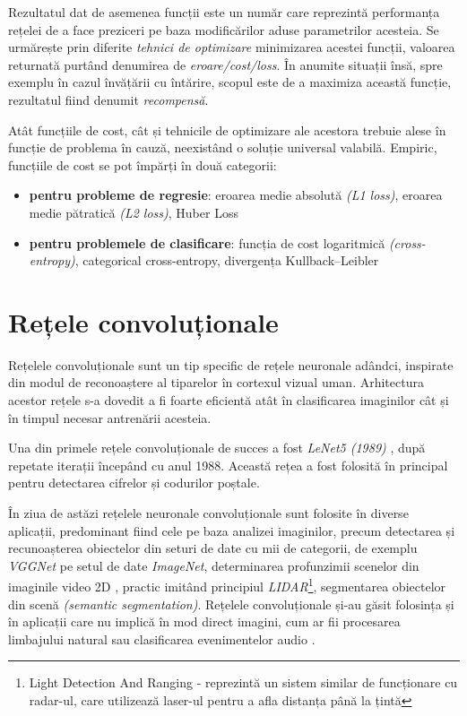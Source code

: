 Rezultatul dat de asemenea funcții este un număr care reprezintă performanța rețelei de a face preziceri pe baza modificărilor aduse parametrilor acesteia. Se urmărește prin diferite \textit{tehnici de optimizare} minimizarea acestei funcții, valoarea returnată purtând denumirea de \textit{eroare/cost/loss}. În anumite situații însă, spre exemplu în cazul învățării cu întărire, scopul este de a maximiza această funcție, rezultatul fiind denumit \textit{recompensă}.

Atât funcțiile de cost, cât și tehnicile de optimizare ale acestora trebuie alese în funcție de problema în cauză, neexistând o soluție universal valabilă. Empiric, funcțiile de cost se pot împărți în două categorii:
\begin{itemize}
\item \textbf{pentru probleme de regresie}: eroarea medie absolută \textit{(L1 loss)}, eroarea medie pătratică \textit{(L2 loss)},  Huber Loss
\item \textbf{pentru problemele de clasificare}: funcția de cost logaritmică \textit{(cross-entropy)}, categorical cross-entropy, divergența Kullback–Leibler
\end{itemize}

\section{Rețele convoluționale}
Rețelele convoluționale sunt un tip specific de rețele neuronale adândci, inspirate din modul de reconoaștere al tiparelor în cortexul vizual uman. Arhitectura acestor rețele s-a dovedit a fi foarte eficientă atât în clasificarea imaginilor cât și în timpul necesar antrenării acesteia.

Una din primele rețele convoluționale de succes a fost \textit{LeNet5 (1989)} \cite{LeNet5}, după repetate iterații începând cu anul 1988. Această rețea a fost folosită în principal pentru detectarea cifrelor și codurilor poștale.

În ziua de astăzi rețelele neuronale convoluționale sunt folosite în diverse aplicații, predominant fiind cele pe baza analizei imaginilor, precum detectarea și recunoașterea obiectelor din seturi de date cu mii de categorii, de exemplu \textit{VGGNet} \cite{simonyan2014deep} pe setul de date \textit{ImageNet}, determinarea profunzimii scenelor din imaginile video 2D \cite{zhou2017unsupervised}, practic imitând principiul \textit{LIDAR}\footnote{Light Detection And Ranging - reprezintă un sistem similar de funcționare cu radar-ul, care utilizează laser-ul pentru a afla distanța până la țintă}, segmentarea obiectelor din scenă \textit{(semantic segmentation)}. Rețelele convoluționale și-au găsit folosința și în aplicații care nu implică în mod direct imagini, cum ar fii procesarea limbajului natural sau clasificarea evenimentelor audio \cite{cnnaudioclass}.

